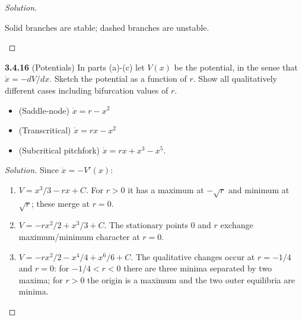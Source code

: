 \documentclass[10pt]{amsart}
\newenvironment{solution}
{\begin{proof}[Solution]}
{\end{proof}}
\begin{document}
\begin{onehalfspace}
\begin{solution}
\medskip
\begin{center}

\small Solid branches are stable; dashed branches are unstable.
\end{center}

\end{solution}

        \noindent\textbf{3.4.16} (Potentials) In parts (a)-(c) let $V(x)$ be the potential, in the sense that
        $\dot{x} = -dV/dx$.
        Sketch the potential as a function of $r$.
        Show all qualitatively different cases including bifurcation values of $r$.
        \begin{itemize}
            \item[a)] (Saddle-node) $\dot{x} = r - x^2$
            \item[b)] (Transcritical) $\dot{x} = rx - x^2$
            \item[c)] (Subcritical pitchfork) $\dot{x} = rx + x^3 - x^5$.
        \end{itemize}

        \begin{solution}
Since $\dot x=-V'(x)$:
\begin{enumerate}[label=(\alph*)]
\item $V=x^3/3-rx+C$. For $r>0$ it has a maximum at $-\sqrt r$ and minimum at $\sqrt r$; these merge at $r=0$.
\item $V=-rx^2/2+x^3/3+C$. The stationary points $0$ and $r$ exchange maximum/minimum character at $r=0$.
\item $V=-rx^2/2-x^4/4+x^6/6+C$. The qualitative changes occur at $r=-1/4$ and $r=0$: for $-1/4<r<0$ there are three minima separated by two maxima; for $r>0$ the origin is a maximum and the two outer equilibria are minima.
\end{enumerate}


\end{solution}
\end{onehalfspace}
\end{document}
